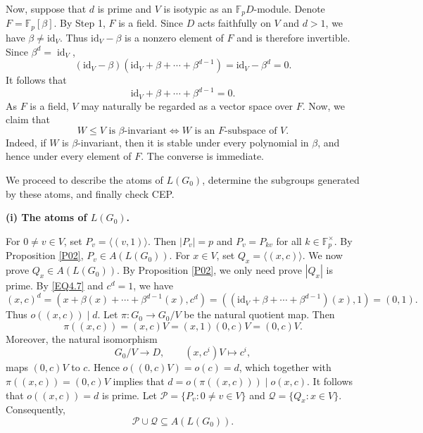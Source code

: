 \documentclass[12pt]{article}
\begin{document}
Now, suppose that $d$ is prime and $V$ is isotypic as an $\mathbb F_pD$-module. Denote $F=\mathbb{F}_p[\beta]$. By Step 1, $F$ is a field.
Since $D$ acts faithfully on $V$ and $d>1$, we have $\beta\neq\mbox{id}_V$. Thus $\mbox{id}_V-\beta$ is a nonzero element of $F$ and is therefore invertible. 
Since $\beta^d=\operatorname{id}_V$,  
$$(\mbox{id}_V-\beta)(\mbox{id}_V+\beta+\cdots+\beta^{d-1})=\mbox{id}_V-\beta^d=0.$$ It follows that
\begin{equation}\label{EQ4.7}
\mbox{id}_V+\beta+\cdots+\beta^{d-1}=0. 
\end{equation}
As $F$ is a field, $V$ may naturally be regarded as a vector space over $F$. Now, we claim that 
\begin{equation}\label{EQ4.00}
W\leq V \mbox{ is } \beta\mbox{-invariant} \Longleftrightarrow W\mbox{ is an }F\mbox{-subspace of } V.
\end{equation} Indeed, if $W$ is $\beta$-invariant, then it is stable under every polynomial in $\beta$, and hence under every element of $F$. 
The converse is immediate.

We proceed to describe the atoms of $L(G_0)$, determine the subgroups generated by these atoms, and finally check CEP.

\textbf{(i) The atoms of $L(G_0)$.} 

For $0\neq v\in V$, set $P_v=\langle (v,1) \rangle$. Then $|P_v|=p$ and $P_v=P_{kv}$ for all $k\in \mathbb{F}_p^\times$. 
By Proposition \ref{P02}, $P_v\in A(L(G_0))$. 
For $x\in V$, set $Q_{x}=\langle (x,c) \rangle$. We now prove $Q_{x}\in A(L(G_0))$. By Proposition \ref{P02}, we only need prove $|Q_x|$ is prime. 
By \eqref{EQ4.7} and $c^d=1$, we have 
\begin{equation}\label{eqqq8}(x,c)^d= (x+\beta(x)+\cdots +\beta^{d-1}(x),c^d)=((\mbox{id}_V+\beta+\cdots+\beta^{d-1})(x),1)=(0,1).\end{equation}
Thus $o((x,c))\mid d$.
Let $\pi: G_0\longrightarrow G_0/V$ be the natural quotient map. Then $$\pi((x,c))=(x,c)V=(x,1)(0,c)V=(0,c)V.$$ 
Moreover, the natural isomorphism
$$G_0/V\longrightarrow D,\qquad (x,c^i)V\longmapsto c^i,$$
maps $(0,c)V$ to $c$. Hence $o((0,c)V)=o(c)=d$, which together with
$\pi((x,c))=(0,c)V$ implies that $d=o(\pi((x,c)))\mid o(x,c)$. It follows that $o((x,c))=d$ is prime. 
Let $\mathcal{P}=\{P_v: 0\neq v\in V\}$ and $\mathcal{Q}=\{Q_x: x\in V\}$.
Consequently, $$\mathcal{P}\cup \mathcal{Q}\subseteq A(L(G_0)).$$
\end{document}
